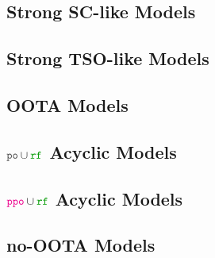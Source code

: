 \subsection{Strong SC-like Models}

\subsection{Strong TSO-like Models}

\subsection{OOTA Models}

\subsection{$\lPO\cup\lRF$ Acyclic Models}

\subsection{$\lPPO\cup\lRF$ Acyclic Models}

\subsection{no-OOTA Models}
 
\onecolumn

